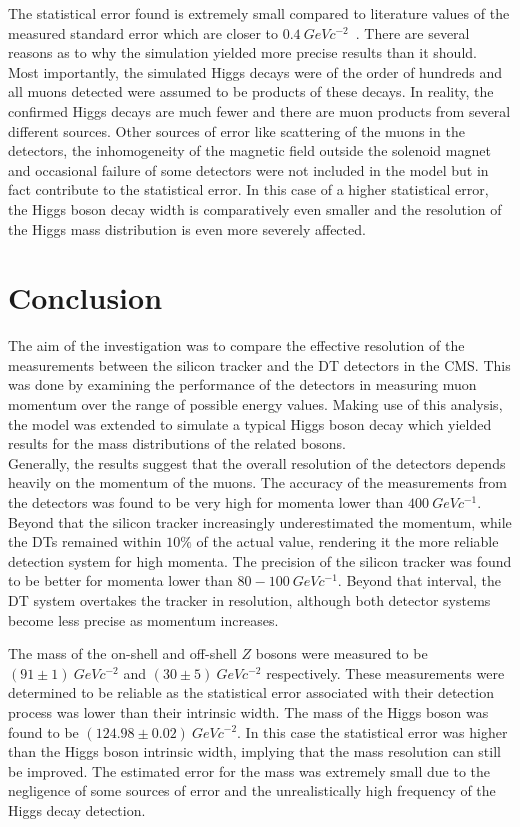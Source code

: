 \documentclass{article}
\begin{document}
The statistical error found is extremely small compared to literature values of the measured standard error which are closer to $0.4\ GeVc^{-2}$~\cite{higgsuncertainty}. There are several reasons as to why the simulation yielded more precise results than it should. Most importantly, the simulated Higgs decays were of the order of hundreds and all muons detected were assumed to be products of these decays. In reality, the confirmed Higgs decays are much fewer and there are muon products from several different sources. Other sources of error like scattering of the muons in the detectors, the inhomogeneity of the magnetic field outside the solenoid magnet and occasional failure of some detectors were not included in the model but in fact contribute to the statistical error. In this case of a higher statistical error, the Higgs boson decay width is comparatively even smaller and the resolution of the Higgs mass distribution is even more severely affected.

\section*{Conclusion}

The aim of the investigation was to compare the effective resolution of the measurements between the silicon tracker and the DT detectors in the CMS. This was done by examining the performance of the detectors in measuring muon momentum over the range of possible energy values. Making use of this analysis, the model was extended to simulate a typical Higgs boson decay which yielded results for the mass distributions of the related bosons.\\

Generally, the results suggest that the overall resolution of the detectors depends heavily on the momentum of the muons. The accuracy of the measurements from the detectors was found to be very high for momenta lower than $400\ GeVc^{-1}$. Beyond that the silicon tracker increasingly underestimated the momentum, while the DTs remained within $10\%$ of the actual value, rendering it the more reliable detection system for high momenta. The precision of the silicon tracker was found to be better for momenta lower than $80 - 100\ GeVc^{-1}$. Beyond that interval, the DT system overtakes the tracker in resolution, although both detector systems become less precise as momentum increases.

\pagebreak

The mass of the on-shell and off-shell $Z$ bosons were measured to be $(91\pm1)\ GeVc^{-2}$ and $(30\pm5)\ GeVc^{-2}$ respectively. These measurements were determined to be reliable as the statistical error associated with their detection process was lower than their intrinsic width. The mass of the Higgs boson was found to be $(124.98\pm0.02)\ GeVc^{-2}$. In this case the statistical error was higher than the Higgs boson intrinsic width, implying that the mass resolution can still be improved. The estimated error for the mass was extremely small due to the negligence of some sources of error and the unrealistically high frequency of the Higgs decay detection.\\
\end{document}
